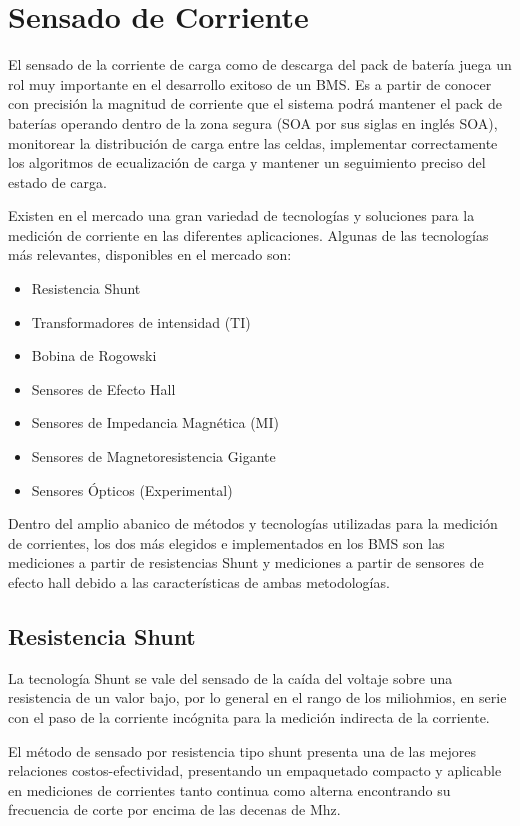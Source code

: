 \section{Sensado de Corriente}

El sensado de la corriente de carga como de descarga del pack de batería juega
un rol muy importante en el desarrollo exitoso de un \acrshort{BMS}. Es a partir
de conocer con precisión la magnitud de corriente que el sistema podrá mantener
el pack de baterías operando dentro de la zona segura (\acrshort{SOA} por sus
siglas en ingl\'es \acrlong{SOA}), monitorear la distribución de carga entre las 
celdas, implementar correctamente los algoritmos de ecualización de carga y 
mantener un seguimiento preciso del estado de carga.

Existen en el mercado una gran variedad de tecnologías y soluciones para la 
medición de corriente en las diferentes aplicaciones. 
Algunas de las tecnologías más relevantes, disponibles en el mercado son:
\begin{itemize}
    \item Resistencia Shunt
    \item Transformadores de intensidad (TI)
    \item Bobina de Rogowski 
    \item Sensores de Efecto Hall
    \item Sensores de Impedancia Magnética (MI)
    \item Sensores de Magnetoresistencia Gigante 
    \item Sensores Ópticos (Experimental)
\end{itemize}

Dentro del amplio abanico de métodos y tecnologías utilizadas para la medición
de corrientes, los dos más elegidos e implementados en los \acrshort{BMS} son 
las mediciones a partir de resistencias Shunt y mediciones a partir de sensores 
de efecto hall debido a las caracter\'isticas de ambas metodolog\'ias.

\subsection{Resistencia Shunt}

La tecnología Shunt se vale del sensado de la caída del voltaje sobre una
resistencia de un valor bajo, por lo general en el rango de los miliohmios, 
en serie con el paso de la corriente incógnita para la medición indirecta de la 
corriente.

El método de sensado por resistencia tipo shunt presenta una de las mejores
relaciones costos-efectividad, presentando un empaquetado compacto y aplicable
en mediciones de corrientes tanto continua como alterna encontrando su
frecuencia de corte por encima de las decenas de Mhz.

